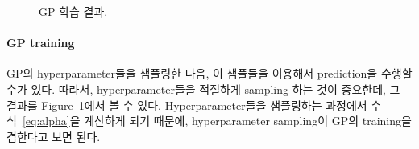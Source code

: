 \documentclass[ba, 11pt]{imsart}
\begin{document}
\begin{figure}[t]
  \centering
  \caption{GP 학습 결과.}\label{fig:hyper}
\end{figure}
%
\paragraph{GP training}
GP의 hyperparameter들을 샘플링한 다음, 이 샘플들을 이용해서 prediction을 수행할 수가 있다.
따라서, hyperparameter들을 적절하게 sampling 하는 것이 중요한데, 그 결과를 Figure~\ref{fig:hyper}에서 볼 수 있다.
Hyperparameter들을 샘플링하는 과정에서 수식~\eqref{eq:alpha}을 계산하게 되기 때문에, hyperparameter sampling이 GP의 training을 겸한다고 보면 된다.
\end{document}
